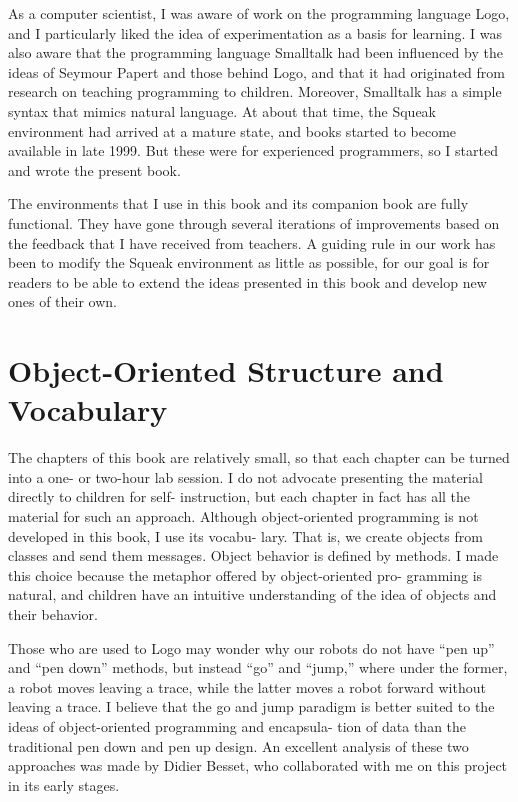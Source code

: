 \documentclass[a4paper,10pt,twoside]{book}
\begin{document}
As a computer scientist, I was aware of work on the programming language Logo, and I 
particularly liked the idea of experimentation as a basis for learning. I was also aware that the 
programming language Smalltalk had been influenced by the ideas of Seymour Papert and 
those behind Logo, and that it had originated from research on teaching programming to 
children. Moreover, Smalltalk has a simple syntax that mimics natural language. At about that 
time, the Squeak environment had arrived at a mature state, and books started to become 
available in late 1999. But these were for experienced programmers, so I started and wrote 
the present book. 

The environments that I use in this book and its companion book are fully functional. 
They have gone through several iterations of improvements based on the feedback that I have 
received from teachers. A guiding rule in our work has been to modify the Squeak environment 
as little as possible, for our goal is for readers to be able to extend the ideas presented in this 
book and develop new ones of their own. 

\section*{Object-Oriented Structure and Vocabulary}

The chapters of this book are relatively small, so that each chapter can be turned into a one- 
or two-hour lab session. I do not advocate presenting the material directly to children for self- 
instruction, but each chapter in fact has all the material for such an approach. 
Although object-oriented programming is not developed in this book, I use its vocabu- 
lary. That is, we create objects from classes and send them messages. Object behavior is 
defined by methods. I made this choice because the metaphor offered by object-oriented pro- 
gramming is natural, and children have an intuitive understanding of the idea of objects and 
their behavior. 

Those who are used to Logo may wonder why our robots do not have “pen up” and “pen 
down” methods, but instead “go” and “jump,” where under the former, a robot moves leaving 
a trace, while the latter moves a robot forward without leaving a trace. I believe that the go and 
jump paradigm is better suited to the ideas of object-oriented programming and encapsula- 
tion of data than the traditional pen down and pen up design. An excellent analysis of these 
two approaches was made by Didier Besset, who collaborated with me on this project in its 
early stages. 
\end{document}
